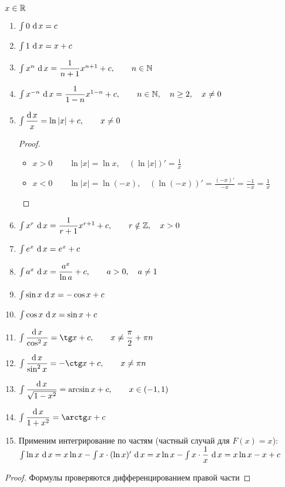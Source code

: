 \begin{statements}
	$ x \in \mathbb{R} $
    \begin{enumerate}
    	\item $ \int {0} \, \operatorname{d} {x} = c $
        \item $ \int {1} \, \operatorname{d} {x} = x + c $
        \item $ \int {x^n} \, \operatorname{d} {x} = \dfrac1{n + 1}x^{n + 1} + c, \qquad n \in \mathbb{N} $
        \item $ \int {x^{-n}} \, \operatorname{d} {x} = \dfrac1{1 - n}x^{1 - n} + c, \qquad n \in \mathbb{N}, \quad n \ge 2, \quad x \ne 0 $
        \item $  \int{ \dfrac{\operatorname{d} {x}}{{x}} }  = \ln |x| + c, \qquad x \ne 0 $
        \begin{proof}
        	\hfill
            \begin{itemize}
            	\item $x > 0 \qquad \ln |x| = \ln x, \quad (\ln |x|)' = \frac1x $
                \item $ x < 0 \qquad \ln |x| = \ln(-x), \quad (\ln(-x))' = \frac{(-x)'}{-x} = \frac{-1}{-x} = \frac1x $
            \end{itemize}
        \end{proof}
        \item $ \int {x^r} \, \operatorname{d} {x} = \dfrac1{r + 1}x^{r + 1} + c, \qquad r \notin \mathbb{Z}, \quad x > 0 $
        \item $ \int {e^x} \, \operatorname{d} {x} = e^x + c $
        \item $ \int {a^x} \, \operatorname{d} {x} = \dfrac{a^x}{\ln a} + c, \qquad a > 0, \quad a \ne 1 $
        \item $ \int {\sin x} \, \operatorname{d} {x} = -\cos x + c $
        \item $ \int {\cos x} \, \operatorname{d} {x} = \sin x + c $
        \item $ \ufint{\cos^2 x} = \tg x + c, \qquad x \ne \dfrac\pi2 + \pi n $
        \item $ \ufint{\sin^2 x} = -\ctg x + c, \qquad x \ne \pi n $
        \item $  \int{ \dfrac{\operatorname{d} {x}}{{\sqrt{1 - x^2}}} }  = \arcsin x + c, \qquad x \in (-1, 1) $
        \item $ \ufint{1 + x^2} = \arctg x + c $
        \item Применим интегрирование по частям (частный случай для $F(x) = x$): \\
        $ \int {\ln x} \, \operatorname{d} {x} = x \ln x - \int {x \cdot (\ln x)'} \, \operatorname{d} {x} = x \ln x - \int {x \cdot \dfrac1x} \, \operatorname{d} {x} = x \ln x - x + c $
    \end{enumerate}
\end{statements}

\begin{proof}
	Формулы проверяются дифференцированием правой части
\end{proof}

